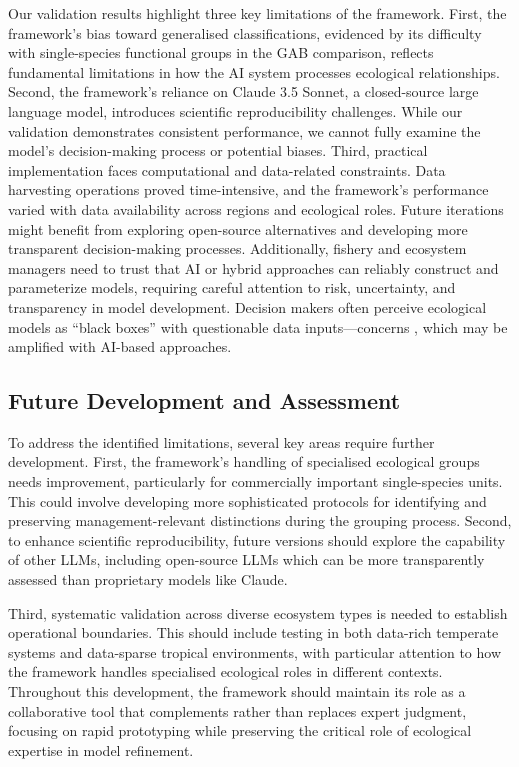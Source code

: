 Our validation results highlight three key limitations of the framework. First, the framework's bias toward generalised classifications, evidenced by its difficulty with single-species functional groups in the GAB comparison, reflects fundamental limitations in how the AI system processes ecological relationships. Second, the framework's reliance on Claude 3.5 Sonnet, a closed-source large language model, introduces scientific reproducibility challenges. While our validation demonstrates consistent performance, we cannot fully examine the model's decision-making process or potential biases. Third, practical implementation faces computational and data-related constraints. Data harvesting operations proved time-intensive, and the framework's performance varied with data availability across regions and ecological roles. Future iterations might benefit from exploring open-source alternatives \citep{Kommineni2024} and developing more transparent decision-making processes. Additionally, fishery and ecosystem managers need to trust that AI or hybrid approaches can reliably construct and parameterize models, requiring careful attention to risk, uncertainty, and transparency in model development. Decision makers often perceive ecological models as ``black boxes'' with questionable data inputs—concerns \citep{Boschetti2018}, which may be amplified with AI-based approaches.

\subsection{Future Development and Assessment}

To address the identified limitations, several key areas require further development. First, the framework's handling of specialised ecological groups needs improvement, particularly for commercially important single-species units. This could involve developing more sophisticated protocols for identifying and preserving management-relevant distinctions during the grouping process. Second, to enhance scientific reproducibility, future versions should explore the capability of other LLMs, including open-source LLMs which can be more transparently assessed than proprietary models like Claude.

Third, systematic validation across diverse ecosystem types is needed to establish operational boundaries. This should include testing in both data-rich temperate systems and data-sparse tropical environments, with particular attention to how the framework handles specialised ecological roles in different contexts. Throughout this development, the framework should maintain its role as a collaborative tool that complements rather than replaces expert judgment, focusing on rapid prototyping while preserving the critical role of ecological expertise in model refinement.

